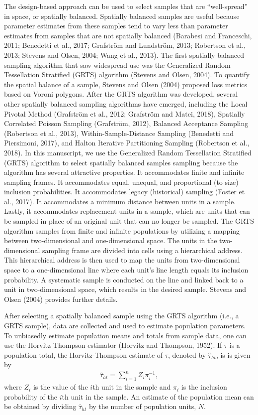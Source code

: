 \documentclass[]{elsarticle} %
\begin{document}
The design-based approach can be used to select samples that are
``well-spread'' in space, or spatially balanced. Spatially balanced
samples are useful because parameter estimates from these samples tend
to vary less than parameter estimates from samples that are not
spatially balanced (Barabesi and Franceschi, 2011; Benedetti et al.,
2017; Grafström and Lundström, 2013; Robertson et al., 2013; Stevens and
Olsen, 2004; Wang et al., 2013). The first spatially balanced sampling
algorithm that saw widespread use was the Generalized Random
Tessellation Stratified (GRTS) algorithm (Stevens and Olsen, 2004). To
quantify the spatial balance of a sample, Stevens and Olsen (2004)
proposed loss metrics based on Voroni polygons. After the GRTS algorithm
was developed, several other spatially balanced sampling algorithms have
emerged, including the Local Pivotal Method (Grafström et al., 2012;
Grafström and Matei, 2018), Spatially Correlated Poisson Sampling
(Grafström, 2012), Balanced Acceptance Sampling (Robertson et al.,
2013), Within-Sample-Distance Sampling (Benedetti and Piersimoni, 2017),
and Halton Iterative Partitioning Sampling (Robertson et al., 2018). In
this manuscript, we use the Generalized Random Tessellation Stratified
(GRTS) algorithm to select spatially balanced samples sampling because
the algorithm has several attractive properties. It accommodates finite
and infinite sampling frames. It accommodates equal, unequal, and
proportional (to size) inclusion probabilities. It accommodates legacy
(historical) sampling (Foster et al., 2017). It accommodates a minimum
distance between units in a sample. Lastly, it accommodates replacement
units in a sample, which are units that can be sampled in place of an
original unit that can no longer be sampled. The GRTS algorithm samples
from finite and infinite populations by utilizing a mapping between
two-dimensional and one-dimensional space. The units in the
two-dimensional sampling frame are divided into cells using a
hierarchical address. This hierarchical address is then used to map the
units from two-dimensional space to a one-dimensional line where each
unit's line length equals its inclusion probability. A systematic sample
is conducted on the line and linked back to a unit in two-dimensional
space, which results in the desired sample. Stevens and Olsen (2004)
provides further details.

After selecting a spatially balanced sample using the GRTS algorithm
(i.e., a GRTS sample), data are collected and used to estimate
population parameters. To unbiasedly estimate population means and
totals from sample data, one can use the Horvitz-Thompson estimator
(Horvitz and Thompson, 1952). If \(\tau\) is a population total, the
Horvitz-Thompson estimate of \(\tau\), denoted by \(\hat{\tau}_{ht}\),
is is given by \begin{align}\label{eq:ht}
  \hat{\tau}_{ht} = \sum_{i = 1}^n Z_i \pi_i^{-1},
\end{align} where \(Z_i\) is the value of the \(i\)th unit in the sample
and \(\pi_i\) is the inclusion probability of the \(i\)th unit in the
sample. An estimate of the population mean can be obtained by dividing
\(\hat{\tau}_{ht}\) by the number of population units, \(N\).
\end{document}

